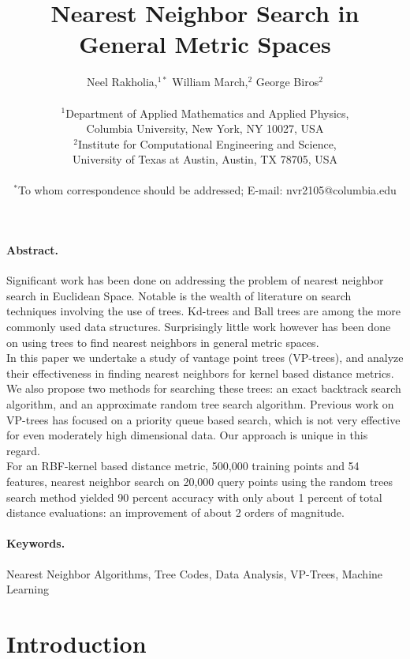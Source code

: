 \documentclass[11pt]{article}
\title{Nearest Neighbor Search in General Metric Spaces}
\author
{Neel Rakholia,$^{1\ast}$ William March,$^{2}$ George Biros$^{2}$\\
\\
\normalsize{$^{1}$Department of Applied Mathematics and Applied Physics,}\\
\normalsize{Columbia University,}
\normalsize{New York, NY 10027, USA}\\
\normalsize{$^{2}$Institute for Computational Engineering and Science,}\\
\normalsize{University of Texas at Austin,}
\normalsize{Austin, TX 78705, USA}\\
\\
\normalsize{$^\ast$To whom correspondence should be addressed; E-mail:  nvr2105@columbia.edu}
}
\date{}
\begin{document}
\maketitle 

\paragraph{Abstract.} Significant work has been done on addressing the problem of nearest neighbor search in Euclidean Space. Notable is the wealth of literature on search techniques involving the use of trees. Kd-trees and Ball trees are among the more commonly used data structures. Surprisingly little work however has been done on using trees to find nearest neighbors in general metric spaces.
\\
\indent In this paper we undertake a study of vantage point trees (VP-trees), and analyze their effectiveness in finding nearest neighbors for kernel based distance metrics. We also propose two methods for searching these trees: an exact backtrack search algorithm, and an approximate random tree search algorithm. Previous work on VP-trees has focused on a priority queue based search, which is not very effective for even moderately high dimensional data. Our approach is unique in this regard.
\\
\indent For an RBF-kernel based distance metric, 500,000 training points and 54 features, nearest neighbor search on 20,000 query points using the random trees search method yielded 90 percent accuracy with only about 1 percent of total distance evaluations: an improvement of about 2 orders of magnitude. 

\paragraph{Keywords.} Nearest Neighbor Algorithms, Tree Codes, Data Analysis, VP-Trees, Machine Learning

\section{Introduction} 
\end{document}
